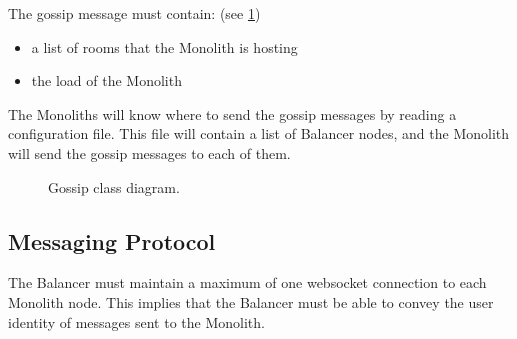 The gossip message must contain: (see \ref{Figure::gossip-class-diag})
\begin{itemize}
  \item a list of rooms that the Monolith is hosting
  \item the load of the Monolith
\end{itemize}

The Monoliths will know where to send the gossip messages by reading a configuration file. This file will contain a list of Balancer nodes, and the Monolith will send the gossip messages to each of them.

\begin{figure}[!htb]
  \centering
  \caption{\label{Figure::gossip-class-diag} Gossip class diagram.}
\end{figure}

\subsection{Messaging Protocol}

The Balancer must maintain a maximum of one websocket connection to each Monolith node. This implies that the Balancer must be able to convey the user identity of messages sent to the Monolith.


